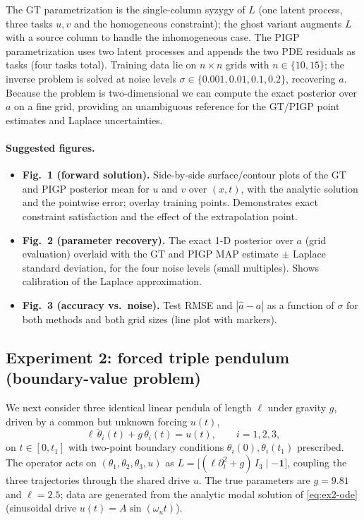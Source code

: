 The GT parametrization is the single-column syzygy of $L$ (one latent
process, three tasks $u,v$ and the homogeneous constraint); the ghost
variant augments $L$ with a source column to handle the inhomogeneous
case.  The PIGP parametrization uses two latent processes and appends
the two PDE residuals as tasks (four tasks total).  Training data lie on
$n\times n$ grids with $n\in\{10,15\}$; the inverse problem is solved at
noise levels $\sigma\in\{0.001,0.01,0.1,0.2\}$, recovering $a$.  Because
the problem is two-dimensional we can compute the exact posterior over
$a$ on a fine grid, providing an unambiguous reference for the
GT/PIGP point estimates and Laplace uncertainties.

\paragraph{Suggested figures.}
\begin{itemize}
  \item \textbf{Fig.~1 (forward solution).} Side-by-side surface/contour
        plots of the GT and PIGP posterior mean for $u$ and $v$ over
        $(x,t)$, with the analytic solution and the pointwise error;
        overlay training points. Demonstrates exact constraint
        satisfaction and the effect of the extrapolation point.
  \item \textbf{Fig.~2 (parameter recovery).} The exact 1-D posterior
        over $a$ (grid evaluation) overlaid with the GT and PIGP MAP
        estimate $\pm$ Laplace standard deviation, for the four noise
        levels (small multiples). Shows calibration of the Laplace
        approximation.
  \item \textbf{Fig.~3 (accuracy vs.\ noise).} Test RMSE and
        $|\hat a-a|$ as a function of $\sigma$ for both methods and both
        grid sizes (line plot with markers).
\end{itemize}

\subsection{Experiment 2: forced triple pendulum (boundary-value problem)}
\label{sec:ex2}

We next consider three identical linear pendula of length $\ell$ under
gravity $g$, driven by a common but unknown forcing $u(t)$,
\begin{equation}
  \ell\,\ddot\theta_i(t) + g\,\theta_i(t) = u(t),
  \qquad i=1,2,3,
  \label{eq:ex2-ode}
\end{equation}
on $t\in[0,t_1]$ with two-point boundary conditions
$\theta_i(0),\theta_i(t_1)$ prescribed.  The operator acts on
$(\theta_1,\theta_2,\theta_3,u)$ as
$L=\bigl[(\ell\partial_t^2+g)\,I_3 \mid -\bm{1}\bigr]$, coupling the
three trajectories through the shared drive $u$.  The true parameters
are $g=9.81$ and $\ell=2.5$; data are generated from the analytic
modal solution of \eqref{eq:ex2-ode} (sinusoidal drive
$u(t)=A\sin(\omega_u t)$).

